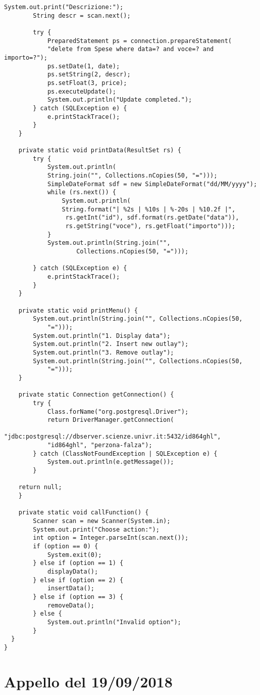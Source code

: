\documentclass[a4paper, 10pt, titlepage]{article}
\begin{document}
\begin{lstlisting}[tabsize=2]
		System.out.print("Descrizione:");
		String descr = scan.next();
		
		try {
			PreparedStatement ps = connection.prepareStatement(
			"delete from Spese where data=? and voce=? and importo=?");
			ps.setDate(1, date);
			ps.setString(2, descr);
			ps.setFloat(3, price);
			ps.executeUpdate();
			System.out.println("Update completed.");
		} catch (SQLException e) {
			e.printStackTrace();
		}
	}
	
	private static void printData(ResultSet rs) {
		try {
			System.out.println(
			String.join("", Collections.nCopies(50, "=")));
			SimpleDateFormat sdf = new SimpleDateFormat("dd/MM/yyyy");
			while (rs.next()) {
				System.out.println(
				String.format("| %2s | %10s | %-20s | %10.2f |",
				 rs.getInt("id"), sdf.format(rs.getDate("data")), 
				 rs.getString("voce"), rs.getFloat("importo")));
			}
			System.out.println(String.join("", 
					Collections.nCopies(50, "=")));
		
		} catch (SQLException e) {
			e.printStackTrace();
		}
	}
	
	private static void printMenu() {
		System.out.println(String.join("", Collections.nCopies(50,
			"=")));
		System.out.println("1. Display data");
		System.out.println("2. Insert new outlay");
		System.out.println("3. Remove outlay");
		System.out.println(String.join("", Collections.nCopies(50, 
			"=")));
	}
	
	private static Connection getConnection() {
		try {
			Class.forName("org.postgresql.Driver");
			return DriverManager.getConnection(
			"jdbc:postgresql://dbserver.scienze.univr.it:5432/id864ghl",
			"id864ghl", "perzona-falza");
		} catch (ClassNotFoundException | SQLException e) {
			System.out.println(e.getMessage());
		}
	
	return null;
	}
	
	private static void callFunction() {
		Scanner scan = new Scanner(System.in);
		System.out.print("Choose action:");
		int option = Integer.parseInt(scan.next());
		if (option == 0) {
			System.exit(0);
		} else if (option == 1) {
			displayData();
		} else if (option == 2) {
			insertData();
		} else if (option == 3) {
			removeData();
		} else {
			System.out.println("Invalid option");
		}
  }
}
\end{lstlisting}

\newpage

\section{Appello del 19/09/2018}
\end{document}
